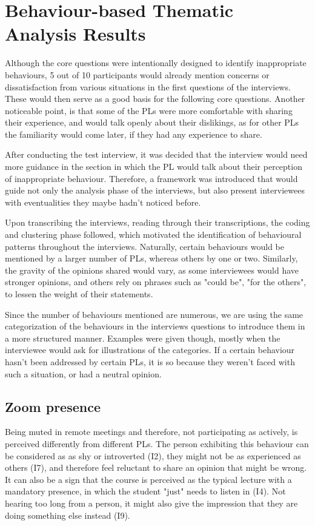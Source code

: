 \section{Behaviour-based Thematic Analysis Results}\label{Behaviours}

Although the core questions were intentionally designed to identify inappropriate behaviours, 5 out of 10 participants would already mention concerns or dissatisfaction from various situations in the first questions of the interviews. These would then serve as a good basis for the following core questions. Another noticeable point, is that some of the PLs were more comfortable with sharing their experience, and would talk openly about their dislikings, as for other PLs the familiarity would come later, if they had any experience to share. 

After conducting the test interview, it was decided that the interview would need more guidance in the section in which the PL would talk about their perception of inappropriate behaviour. Therefore, a framework was introduced that would guide not only the analysis phase of the interviews, but also present interviewees with eventualities they maybe hadn't noticed before.

Upon transcribing the interviews, reading through their transcriptions, the coding and clustering phase followed, which motivated the identification of behavioural patterns throughout the interviews. Naturally, certain behaviours would be mentioned by a larger number of PLs, whereas others by one or two. Similarly, the gravity of the opinions shared would vary, as some interviewees would have stronger opinions, and others rely on phrases such as "could be", "for the others", to lessen the weight of their statements.

Since the number of behaviours mentioned are numerous, we are using the same categorization of the behaviours in the interviews questions to introduce them in a more structured manner. Examples were given though, mostly when the interviewee would ask for illustrations of the categories. If a certain behaviour hasn't been addressed by certain PLs, it is so because they weren't faced with such a situation, or had a neutral opinion. 

\subsection{Zoom presence}

Being muted in remote meetings and therefore, not participating as actively, is perceived differently from different PLs. The person exhibiting this behaviour can be considered as as shy or introverted (I2), they might not be as experienced as others (I7), and therefore feel reluctant to share an opinion that might be wrong. It can also be a sign that the course is perceived as the typical lecture with a mandatory presence, in which the student "just" needs to listen in (I4). Not hearing too long from a person, it might also give the impression that they are doing something else instead (I9).

